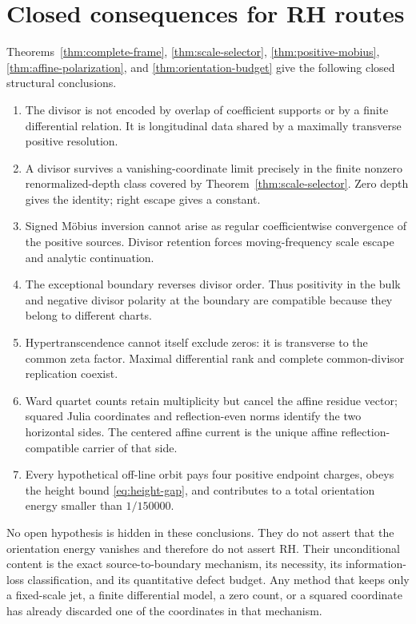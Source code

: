 \documentclass[11pt]{article}
\theoremstyle{definition}
\theoremstyle{remark}
\begin{document}
\section{Closed consequences for RH routes}\label{sec:closed-scope}

Theorems~\ref{thm:complete-frame}, \ref{thm:scale-selector},
\ref{thm:positive-mobius}, \ref{thm:affine-polarization}, and
\ref{thm:orientation-budget} give the following closed structural conclusions.

\begin{enumerate}[label=\textup{(\arabic*)}]
\item The divisor is not encoded by overlap of coefficient supports or by a finite differential
relation.  It is longitudinal data shared by a maximally transverse positive resolution.
\item A divisor survives a vanishing-coordinate limit precisely in the finite nonzero
renormalized-depth class covered by Theorem~\ref{thm:scale-selector}.  Zero depth gives the
identity; right escape gives a constant.
\item Signed M\"obius inversion cannot arise as regular coefficientwise convergence of the
positive sources.  Divisor retention forces moving-frequency scale escape and analytic
continuation.
\item The exceptional boundary reverses divisor order.  Thus positivity in the bulk and
negative divisor polarity at the boundary are compatible because they belong to different
charts.
\item Hypertranscendence cannot itself exclude zeros: it is transverse to the common zeta
factor.  Maximal differential rank and complete common-divisor replication coexist.
\item Ward quartet counts retain multiplicity but cancel the affine residue vector; squared
Julia coordinates and reflection-even norms identify the two horizontal sides.  The centered
affine current is the unique affine reflection-compatible carrier of that side.
\item Every hypothetical off-line orbit pays four positive endpoint charges, obeys the height
bound \eqref{eq:height-gap}, and contributes to a total orientation energy smaller than
\(1/150000\).
\end{enumerate}

No open hypothesis is hidden in these conclusions.  They do not assert that the orientation
energy vanishes and therefore do not assert RH.  Their unconditional content is the exact
source-to-boundary mechanism, its necessity, its information-loss classification, and its
quantitative defect budget.  Any method that keeps only a fixed-scale jet, a finite differential
model, a zero count, or a squared coordinate has already discarded one of the coordinates in
that mechanism.
\end{document}
